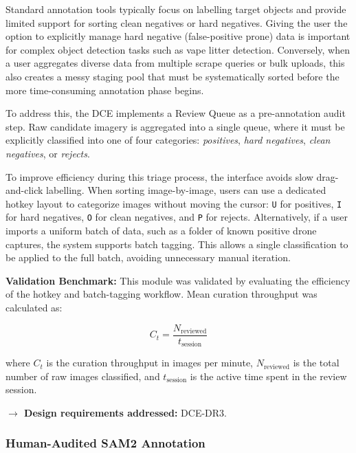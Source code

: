 Standard annotation tools typically focus on labelling target objects and provide limited support for sorting clean negatives or hard negatives. Giving the user the option to explicitly manage hard negative (false-positive prone) data is important for complex object detection tasks such as vape litter detection. Conversely, when a user aggregates diverse data from multiple scrape queries or bulk uploads, this also creates a messy staging pool that must be systematically sorted before the more time-consuming annotation phase begins.

To address this, the DCE implements a Review Queue as a pre-annotation audit step. Raw candidate imagery is aggregated into a single queue, where it must be explicitly classified into one of four categories: \textit{positives}, \textit{hard negatives}, \textit{clean negatives}, or \textit{rejects}.

To improve efficiency during this triage process, the interface avoids slow drag-and-click labelling. When sorting image-by-image, users can use a dedicated hotkey layout to categorize images without moving the cursor: \texttt{U} for positives, \texttt{I} for hard negatives, \texttt{O} for clean negatives, and \texttt{P} for rejects. Alternatively, if a user imports a uniform batch of data, such as a folder of known positive drone captures, the system supports batch tagging. This allows a single classification to be applied to the full batch, avoiding unnecessary manual iteration.

\textbf{Validation Benchmark:} This module was validated by evaluating the efficiency of the hotkey and batch-tagging workflow. Mean curation throughput was calculated as:

\begin{equation}
\label{eq:curation_throughput}
C_t = \frac{N_{\text{reviewed}}}{t_{\text{session}}}
\end{equation}

where \(C_t\) is the curation throughput in images per minute, \(N_{\text{reviewed}}\) is the total number of raw images classified, and \(t_{\text{session}}\) is the active time spent in the review session.

\vspace{0.5em}
\noindent\textbf{$\rightarrow$ Design requirements addressed:} DCE-DR3.

\subsubsection{Human-Audited SAM2 Annotation}

